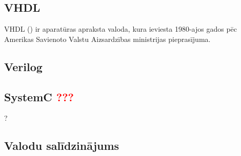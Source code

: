 \subsection{VHDL}
VHDL () ir aparatūras apraksta
valoda, kura ieviesta 1980-ajos gados pēc Amerikas Savienoto Valstu
Aizsardzības ministrijas pieprasījuma.\cite[1.~lpp.]{Perry-VHDL} \todo



\subsection{Verilog}
\todo

\subsection[SystemC]{SystemC \textcolor{red}{???}}
\todo ?

\subsection{Valodu salīdzinājums}
\todo
